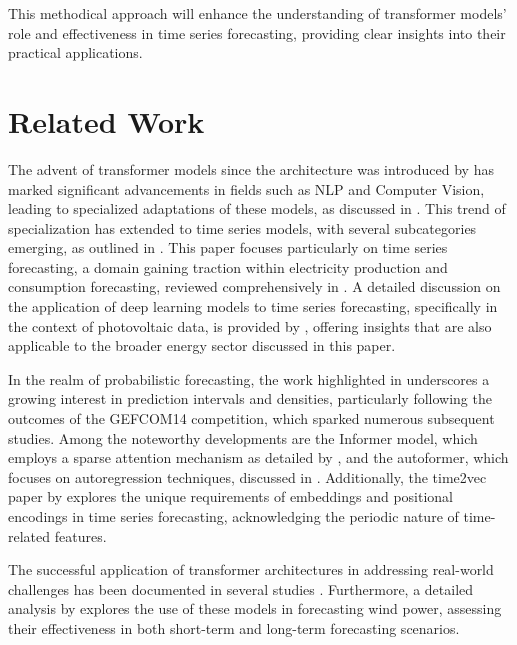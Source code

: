 \documentclass{article}
\begin{document}
This methodical approach will enhance the understanding of transformer models' role and effectiveness in time series forecasting, providing clear insights into their practical applications.


\section{Related Work}

The advent of transformer models since the architecture was introduced by \cite{vanilla-transformer} has marked significant advancements in fields such as NLP and Computer Vision, leading to specialized adaptations of these models, as discussed in \cite{Transformer-Survey}. This trend of specialization has extended to time series models, with several subcategories emerging, as outlined in \cite{Transformer-TS-Survey}. This paper focuses particularly on time series forecasting, a domain gaining traction within electricity production and consumption forecasting, reviewed comprehensively in \cite{forecasting-overview}. A detailed discussion on the application of deep learning models to time series forecasting, specifically in the context of photovoltaic data, is provided by \cite{Transformer-TS-PV}, offering insights that are also applicable to the broader energy sector discussed in this paper.

In the realm of probabilistic forecasting, the work highlighted in \cite{Prob-Forecast-Overview} underscores a growing interest in prediction intervals and densities, particularly following the outcomes of the GEFCOM14 competition, which sparked numerous subsequent studies. Among the noteworthy developments are the Informer model, which employs a sparse attention mechanism as detailed by \cite{Informer}, and the autoformer, which focuses on autoregression techniques, discussed in \cite{autoformer}. Additionally, the time2vec paper by \cite{time2vec} explores the unique requirements of embeddings and positional encodings in time series forecasting, acknowledging the periodic nature of time-related features.

The successful application of transformer architectures in addressing real-world challenges has been documented in several studies \cite{transformer_application_1, transformer_application_2}. Furthermore, a detailed analysis by \cite{transformer_application_survey} explores the use of these models in forecasting wind power, assessing their effectiveness in both short-term and long-term forecasting scenarios.
\end{document}
